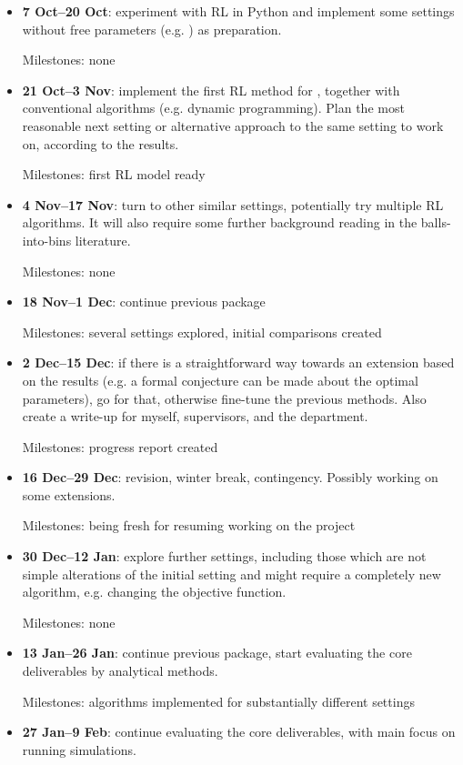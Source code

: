 \begin{itemize}
    \item 
    \textbf{7 Oct--20 Oct}: experiment with RL in Python and implement some settings without free parameters (e.g. \TwoChoice) as preparation.
    
    Milestones: none
    \item
    \textbf{21 Oct--3 Nov}: implement the first RL method for \TwoThinning, together with conventional algorithms (e.g. dynamic programming). Plan the most reasonable next setting or alternative approach to the same setting to work on, according to the results.
    
    Milestones: first RL model ready
    \item
    \textbf{4 Nov--17 Nov}: turn to other similar settings, potentially try multiple RL algorithms. It will also require some further background reading in the balls-into-bins literature.
    
    Milestones: none
    \item
    \textbf{18 Nov--1 Dec}: continue previous package
    
    Milestones: several settings explored, initial comparisons created
    \item
    \textbf{2 Dec--15 Dec}: if there is a straightforward way towards an extension based on the results (e.g. a formal conjecture can be made about the optimal parameters), go for that, otherwise fine-tune the previous methods. Also create a write-up for myself, supervisors, and the department.
   
    Milestones: progress report created
    \item
    \textbf{16 Dec--29 Dec}: revision, winter break, contingency. Possibly working on some extensions.
    
    Milestones: being fresh for resuming working on the project
    \item
    \textbf{30 Dec--12 Jan}: explore further settings, including those which are not simple alterations of the initial setting and might require a completely new algorithm, e.g. changing the objective function.
    
    Milestones: none
    \item
    \textbf{13 Jan--26 Jan}: continue previous package, start evaluating the core deliverables by analytical methods.
    
    Milestones: algorithms implemented for substantially different settings
    \item
    \textbf{27 Jan--9 Feb}: continue evaluating the core deliverables, with main focus on running simulations.
    

\end{itemize}
